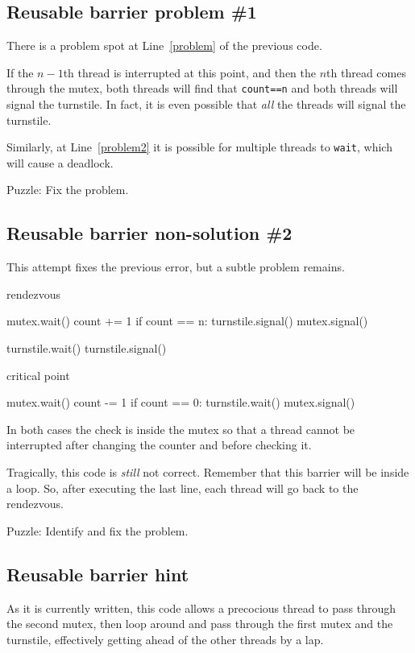 \documentclass{book}
\begin{document}
\subsection {Reusable barrier problem \#1}

There is a problem spot at Line~\ref{problem} of the previous code.

If the $n-1$th thread is interrupted at this point,
and then the $n$th thread comes through the mutex,
both threads will find that {\tt count==n} and both
threads will signal the turnstile.  In fact, it is even
possible that {\em all} the threads will signal the turnstile.

Similarly, at Line~\ref{problem2} it is possible for multiple
threads to {\tt wait}, which will cause a deadlock.

Puzzle: Fix the problem.

\subsection {Reusable barrier non-solution \#2}

This attempt fixes the previous error, but a subtle problem
remains.

\begin{unbreakable}[title={Reusable barrier non-solution}]{}
rendezvous

mutex.wait()
    count += 1
    if count == n: turnstile.signal()
mutex.signal()

turnstile.wait()
turnstile.signal()

critical point

mutex.wait()
    count -= 1
    if count == 0: turnstile.wait()
mutex.signal()
\end{unbreakable}

In both cases the check is inside the mutex so that
a thread cannot be interrupted after changing the counter
and before checking it.

Tragically, this code is {\em still} not correct.
Remember that this barrier will be inside a loop.  So, after
executing the last line, each thread will go back
to the rendezvous.

Puzzle: Identify and fix the problem.



\subsection {Reusable barrier hint}

As it is currently written, this code
allows a precocious thread to pass through the second mutex,
then loop around and pass through the first mutex and the
turnstile, effectively getting ahead of the other threads by
a lap.
\end{document}
